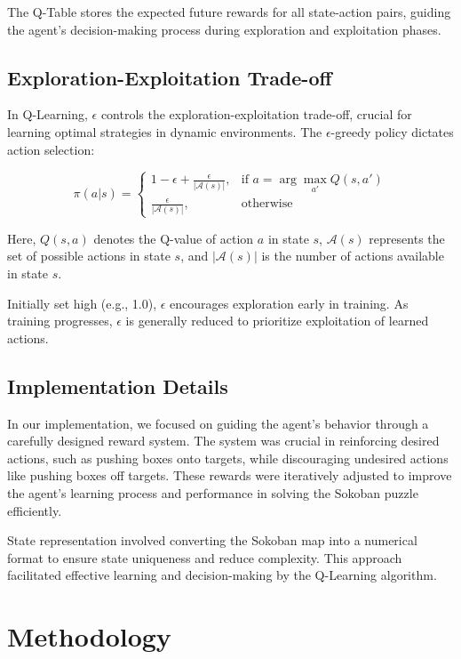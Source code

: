\documentclass[10pt,twocolumn]{article}
\begin{document}
The Q-Table stores the expected future rewards for all state-action pairs, guiding the agent's decision-making process during exploration and exploitation phases.

\subsection{Exploration-Exploitation Trade-off}

In Q-Learning, \( \epsilon \) controls the exploration-exploitation trade-off, crucial for learning optimal strategies in dynamic environments. The \( \epsilon \)-greedy policy dictates action selection:

\[
    \pi(a|s) =
    \begin{cases}
        1 - \epsilon + \frac{\epsilon}{|\mathcal{A}(s)|}, & \text{if } a = \arg\max_{a'} Q(s, a') \\
        \frac{\epsilon}{|\mathcal{A}(s)|},                & \text{otherwise}
    \end{cases}
\]

Here, \( Q(s, a) \) denotes the Q-value of action \( a \) in state \( s \), \( \mathcal{A}(s) \) represents the set of possible actions in state \( s \), and \( |\mathcal{A}(s)| \) is the number of actions available in state \( s \).

Initially set high (e.g., 1.0), \( \epsilon \) encourages exploration early in training. As training progresses, \( \epsilon \) is generally reduced to prioritize exploitation of learned actions.

\subsection{Implementation Details}

In our implementation, we focused on guiding the agent's behavior through a carefully designed reward system. The system was crucial in reinforcing desired actions, such as pushing boxes onto targets, while discouraging undesired actions like pushing boxes off targets. These rewards were iteratively adjusted to improve the agent's learning process and performance in solving the Sokoban puzzle efficiently.

State representation involved converting the Sokoban map into a numerical format to ensure state uniqueness and reduce complexity. This approach facilitated effective learning and decision-making by the Q-Learning algorithm.
\section{Methodology}
\end{document}

